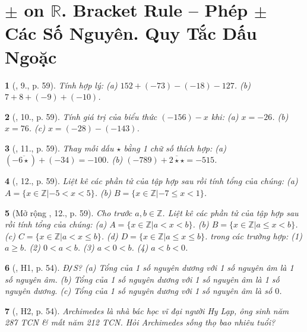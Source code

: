 \documentclass{article}
\newtheorem{baitoan}{}
\begin{document}

\section{$\pm$ on $\mathbb{R}$. Bracket Rule -- Phép $\pm$ Các Số Nguyên. Quy Tắc Dấu Ngoặc}

\begin{baitoan}[\cite{Trong_Toan_6_2021}, 9., p. 59]
	Tính hợp lý: (a) $152 + (-73) - (-18) - 127$. (b) $7 + 8 + (-9) + (-10)$.
\end{baitoan}

\begin{baitoan}[\cite{Trong_Toan_6_2021}, 10., p. 59]
	Tính giá trị của biểu thức $(-156) - x$ khi: (a) $x = -26$. (b) $x = 76$. (c) $x = (-28) - (-143)$.
\end{baitoan}

\begin{baitoan}[\cite{Trong_Toan_6_2021}, 11., p. 59]
	Thay mỗi dấu $\star$ bằng 1 chữ số thích hợp: (a) $(-\overline{6\star}) + (-34) = -100$. (b) $(-789) + \overline{2\star\star} = -515$.
\end{baitoan}

\begin{baitoan}[\cite{Trong_Toan_6_2021}, 12., p. 59]
	Liệt kê các phần tử của tập hợp sau rồi tính tổng của chúng: (a) $A = \{x\in\mathbb{Z}|- 5 < x < 5\}$. (b) $B = \{x\in\mathbb{Z}|-7\le x < 1\}$.
\end{baitoan}

\begin{baitoan}[Mở rộng \cite{Trong_Toan_6_2021}, 12., p. 59]
	Cho trước $a,b\in\mathbb{Z}$. Liệt kê các phần tử của tập hợp sau rồi tính tổng của chúng: (a) $A = \{x\in\mathbb{Z}|a < x < b\}$. (b) $B = \{x\in\mathbb{Z}|a\le x < b\}$. (c) $C = \{x\in\mathbb{Z}|a < x\le b\}$. (d) $D = \{x\in\mathbb{Z}|a\le x\le b\}$. trong các trường hợp: (1) $a\ge b$. (2) $0 < a < b$. (3) $a < 0 < b$. (4) $a < b < 0$.
\end{baitoan}

\begin{baitoan}[\cite{Binh_boi_duong_Toan_6_tap_1}, H1, p. 54]
	{\rm Đ{\tt/}S?} (a) Tổng của 1 số nguyên dương với 1 số nguyên âm là 1 số nguyên âm. (b) Tổng của 1 số nguyên dương với 1 số nguyên âm là 1 số nguyên dương. (c) Tổng của 1 số nguyên dương với 1 số nguyên âm là số $0$.
\end{baitoan}

\begin{baitoan}[\cite{Binh_boi_duong_Toan_6_tap_1}, H2, p. 54]
	Archimedes là nhà bác học vĩ đại người Hy Lạp, ông sinh năm {\rm287 TCN} \& mất năm {\rm212 TCN}. Hỏi Archimedes sống thọ bao nhiêu tuổi?
\end{baitoan}
\end{document}
